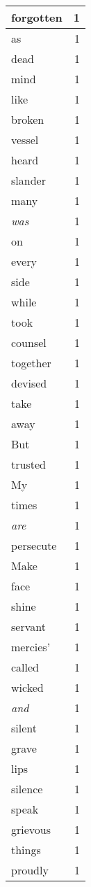 \begin{center}
\begin{longtable}{l|r}
forgotten & 1 \\ \hline
as & 1 \\ \hline
dead & 1 \\ \hline
mind & 1 \\ \hline
like & 1 \\ \hline
broken & 1 \\ \hline
vessel & 1 \\ \hline
heard & 1 \\ \hline
slander & 1 \\ \hline
many & 1 \\ \hline
\emph{was} & 1 \\ \hline
on & 1 \\ \hline
every & 1 \\ \hline
side & 1 \\ \hline
while & 1 \\ \hline
took & 1 \\ \hline
counsel & 1 \\ \hline
together & 1 \\ \hline
devised & 1 \\ \hline
take & 1 \\ \hline
away & 1 \\ \hline
But & 1 \\ \hline
trusted & 1 \\ \hline
My & 1 \\ \hline
times & 1 \\ \hline
\emph{are} & 1 \\ \hline
persecute & 1 \\ \hline
Make & 1 \\ \hline
face & 1 \\ \hline
shine & 1 \\ \hline
servant & 1 \\ \hline
mercies' & 1 \\ \hline
called & 1 \\ \hline
wicked & 1 \\ \hline
\emph{and} & 1 \\ \hline
silent & 1 \\ \hline
grave & 1 \\ \hline
lips & 1 \\ \hline
silence & 1 \\ \hline
speak & 1 \\ \hline
grievous & 1 \\ \hline
things & 1 \\ \hline
proudly & 1 \\ \hline

\end{longtable}
\end{center}
